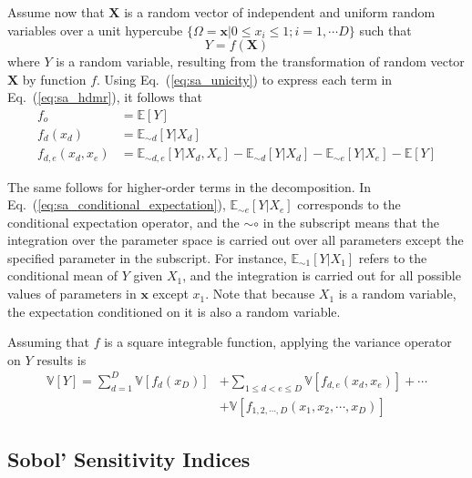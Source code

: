 Assume now that $\mathbf{X}$ is a random vector of independent and uniform random variables over a unit hypercube
$\{\Omega = \mathbf{x} | 0 \leq x_i  \leq 1; i = 1,\cdots D\}$ such that
\begin{equation}
	Y = f(\mathbf{X})
\label{eq:sa_random_function}
\end{equation}
where $Y$ is a random variable, resulting from the transformation of random vector $\mathbf{X}$ by function $f$.
Using Eq.~(\ref{eq:sa_unicity}) to express each term in Eq.~(\ref{eq:sa_hdmr}), it follows that
\begin{equation}
	\begin{split}
		f_o & = \mathbb{E}[Y] \\
	  f_d(x_d) & = \mathbb{E}_{\sim d}[Y|X_d] \\
    f_{d,e}(x_d,x_e) & = \mathbb{E}_{\sim d,e} [Y|X_d, X_e] - \mathbb{E}_{\sim d}[Y|X_d] - \mathbb{E}_{\sim e}[Y|X_e] - \mathbb{E}[Y] 
	\end{split}
\label{eq:sa_conditional_expectation}
\end{equation}

The same follows for higher-order terms in the decomposition. 
In Eq.~(\ref{eq:sa_conditional_expectation}), $\mathbb{E}_{\sim e} [Y|X_e]$ corresponds to the conditional expectation operator,
and the $\sim\circ$ in the subscript means that the integration over the parameter space is carried out over all parameters except the specified parameter in the subscript.
For instance, $\mathbb{E}_{\sim 1} [Y|X_1]$ refers to the conditional mean of $Y$ given $X_1$, and the integration is carried out for all possible values of parameters in $\mathbf{x}$ except $x_1$.
Note that because $X_1$ is a random variable, the expectation conditioned on it is also a random variable.

Assuming that $f$ is a square integrable function, applying the variance operator on $Y$ results is
\begin{equation}
	\begin{split}
		\mathbb{V}[Y] = \sum_{d=1}^{D} \mathbb{V}[f_d (x_D)] & + \sum_{1 \leq d < e \leq D} \mathbb{V} [f_{d,e} (x_d, x_e)] + \cdots \\
	                                                       & + \mathbb{V} [f_{1,2,\cdots,D} (x_1, x_2, \cdots, x_D)]
		\end{split}
\label{eq:sa_variance_decomposition}
\end{equation}

\subsection{Sobol' Sensitivity Indices}\label{sub:sa_sobol_indices}

